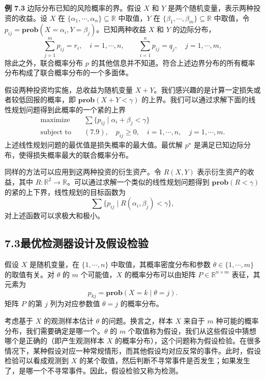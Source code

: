 \documentclass[UTF8, 12pt, fontset=fandol, oneside]{ctexart}
\begin{document}
\noindent\textbf{例 7.3}\quad
边际分布已知的风险概率的界。假设 $X$ 和 $Y$ 是两个随机变量，表示两种投资的收益。设 $X$ 在 $\{\alpha_1,\cdots,\alpha_n\}\subseteq\mathbb{R}$ 中取值，$Y$ 在 $\{\beta_1,\cdots,\beta_m\}\subseteq\mathbb{R}$ 中取值，令 $p_{ij}=\mathbf{prob}(X=\alpha_i,Y=\beta_j)$。已知两种收益 $X$ 和 $Y$ 的边际分布，
\begin{equation}
\sum_{j=1}^m p_{ij}=r_i,\quad i=1,\cdots,n,\qquad
\sum_{i=1}^n p_{ij}=q_j,\quad j=1,\cdots,m,
\tag{7.9}
\end{equation}
除此之外，联合概率分布 $p$ 的其他信息并不知道。符合上述边界分布的所有概率分布构成了联合概率分布的一个多面体。

假设两种投资均实施，总收益为随机变量 $X+Y$。我们感兴趣的是计算一定损失或者较低回报的概率，即 $\mathbf{prob}(X+Y<\gamma)$ 的上界。我们可以通过求解下面的线性规划问题得到此概率的一个紧的上界
\[
\begin{aligned}
\text{maximize}\quad & \sum\{p_{ij}\mid \alpha_i+\beta_j<\gamma\}\\
\text{subject to}\quad & (7.9),\quad p_{ij}\geq 0,\quad i=1,\cdots,n,\quad j=1,\cdots,m.
\end{aligned}
\]
上述线性规划问题的最优值是损失概率的最大值。最优解 $p^\star$ 是满足已知边际分布，使得损失概率最大的联合概率分布。

同样的方法可以应用到这两种投资的衍生资产。令 $R(X,Y)$ 表示衍生资产的收益，其中 $R:\mathbb{R}^2\to\mathbb{R}$。可以通过求解一个类似的线性规划问题得到 $\mathbf{prob}(R<\gamma)$ 的紧的上下界，线性规划的目标函数为
\[
\sum\{p_{ij}\mid R(\alpha_i,\beta_j)<\gamma\},
\]
对上述函数可以求极大和极小。

\subsection*{7.3\quad 最优检测器设计及假设检验}

假设 $X$ 是随机变量，在 $\{1,\cdots,n\}$ 中取值，其概率密度分布和参数 $\theta\in\{1,\cdots,m\}$ 的取值有关。对 $\theta$ 的 $m$ 个可能值，$X$ 的概率分布可以由矩阵 $P\in\mathbb{R}^{n\times m}$ 表征，其元素为
\[
p_{kj}=\mathbf{prob}(X=k\mid \theta=j).
\]
矩阵 $P$ 的第 $j$ 列为对应参数值 $\theta=j$ 的概率分布。

考虑基于 $X$ 的观测样本估计 $\theta$ 的问题。换言之，样本 $X$ 来自于 $m$ 种可能的概率分布，我们需要确定是哪一个。$\theta$ 的 $m$ 个取值称为假设，我们从这些假设中猜想哪个是正确的（即产生观测样本 $X$ 的概率分布），这个问题称为假设检验。在很多情况下，某种假设对应一种常规情形，而其他假设均对应反常的事件。此时，假设检验可以看成观测到 $X$ 的某个取值，然后判断不寻常事件是否发生；如果发生了，是哪一个不寻常事件。因此，假设检验又称为检测。
\end{document}
